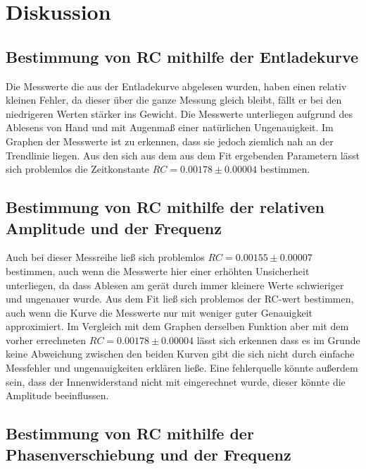 \section{Diskussion}
\label{sec:Diskussion}
\subsection{Bestimmung von RC mithilfe der Entladekurve}

Die Messwerte die aus der Entladekurve abgelesen wurden, haben einen relativ kleinen Fehler, da dieser über die ganze Messung gleich bleibt, fällt er bei den niedrigeren Werten 
stärker ins Gewicht. Die Messwerte unterliegen aufgrund des Ablesens von Hand und mit Augenmaß einer natürlichen Ungenauigkeit. Im Graphen der Messwerte ist zu erkennen, dass sie jedoch ziemlich nah an der Trendlinie liegen.
Aus den sich aus dem aus dem Fit ergebenden Parametern lässt sich problemlos die Zeitkonstante $RC = 0.00178\pm0.00004$ bestimmen.

\subsection{Bestimmung von RC mithilfe der relativen Amplitude und der Frequenz}

Auch bei dieser Messreihe ließ sich problemlos $RC = 0.00155\pm0.00007$ bestimmen, auch wenn die Messwerte hier einer erhöhten Unsicherheit unterliegen, da dass Ablesen am gerät durch immer kleinere Werte schwieriger und ungenauer wurde.
Aus dem Fit ließ sich problemos der RC-wert bestimmen, auch wenn die Kurve die Messwerte nur mit weniger guter Genauigkeit approximiert. Im Vergleich mit dem Graphen derselben Funktion aber mit dem vorher errechneten $RC = 0.00178\pm0.00004$
lässt sich erkennen dass es im Grunde keine Abweichung zwischen den beiden Kurven gibt die sich nicht durch einfache Messfehler und ungenauigkeiten erklären ließe. Eine fehlerquelle könnte außerdem sein, dass der Innenwiderstand nicht mit eingerechnet wurde, dieser könnte die Amplitude beeinflussen.

\subsection{Bestimmung von RC mithilfe der Phasenverschiebung und der Frequenz}

